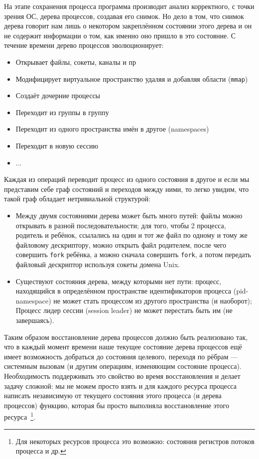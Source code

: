 На этапе сохранения процесса программа производит анализ корректного, с точки зрения ОС, дерева процессов, создавая его снимок. Но дело в том, что снимок дерева говорит нам лишь о некотором закреплённом состоянии этого дерева и он не содержит информации о том, как именно оно пришло в это состояние. С течение времени дерево процессов эволюционирует:

\begin{itemize}
	\item Открывает файлы, сокеты, каналы и пр
	\item Модифицирует виртуальное пространство удаляя и добавляя области (\texttt{mmap})
	\item Создаёт дочерние процессы
	\item Переходит из группы в группу
	\item Переходит из одного пространства имён в другое (namespaces)
	\item Переходит в новую сессию
	\item ...
\end{itemize}

Каждая из операций переводит процесс из одного состояния в другое и если мы представим себе граф состояний и переходов
между ними, то легко увидим, что такой граф обладает нетривиальной структурой:

\begin{itemize}
	\item Между двумя состояниями дерева может быть много путей: файлы можно открывать в разной последовательности; для того, чтобы 2 процесса, родитель и ребёнок, ссылались на один и тот же файл по одному и тому же файловому дескриптору, можно открыть файл родителем, после чего совершить \texttt{fork} ребёнка, а можно сначала совершить \texttt{fork}, а потом передать файловый дескриптор используя сокеты домена Unix.

	\item Существуют состояния дерева, между которыми нет пути: процесс, находящийся в определённом пространстве идентификаторов процесса (pid-namespace) не может стать процессом из другого пространства (и наоборот); Процесс лидер сессии (session leader) не может перестать быть им (не завершаясь).
\end{itemize}

Таким образом восстановление дерева процессов должно быть реализовано так, что в каждый момент времени наше текущее состояние дерева процессов ещё имеет возможность добраться до состояния целевого, переходя по рёбрам --- системным вызовам (и другим операциям, изменяющим состояние процесса). Необходимость поддерживать это свойство во время восстановления и делает задачу сложной: мы не можем просто взять и для каждого ресурса процесса написать независимую от текущего состояния этого процесса (и дерева процессов) функцию, которая бы просто выполняла восстановление этого ресурса~\footnote{Для некоторых ресурсов процесса это возможно: состояния регистров потоков процесса и др.}.

